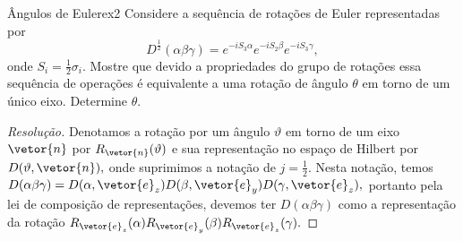\begin{exercício}{Ângulos de Euler}{ex2}
    Considere a sequência de rotações de Euler representadas por
    \begin{equation*}
        D^{\frac12}(\alpha \beta \gamma) = e^{-iS_3 \alpha} e^{-i S_2 \beta} e^{-i S_3 \gamma},
    \end{equation*}
    onde \(S_{i} = \frac12 \sigma_i.\) Mostre que devido a propriedades do grupo de rotações essa sequência de operações é equivalente a uma rotação de ângulo \(\theta\) em torno de um único eixo. Determine \(\theta\).
\end{exercício}
\begin{proof}[Resolução]
    Denotamos a rotação por um ângulo \(\vartheta\) em torno de um eixo \(\vetor{n}\) por \(R_{\vetor{n}}(\vartheta)\) e sua representação no espaço de Hilbert por \(D(\vartheta, \vetor{n}),\) onde suprimimos a notação de \(j = \frac12.\) Nesta notação, temos \(D(\alpha \beta \gamma) = D(\alpha, \vetor{e}_z) D(\beta, \vetor{e}_y) D(\gamma, \vetor{e}_z),\) portanto pela lei de composição de representações, devemos ter \(D(\alpha \beta \gamma)\) como a representação da rotação \(R_{\vetor{e}_z}(\alpha) R_{\vetor{e}_y}(\beta) R_{\vetor{e}_z}(\gamma).\)
\end{proof}
